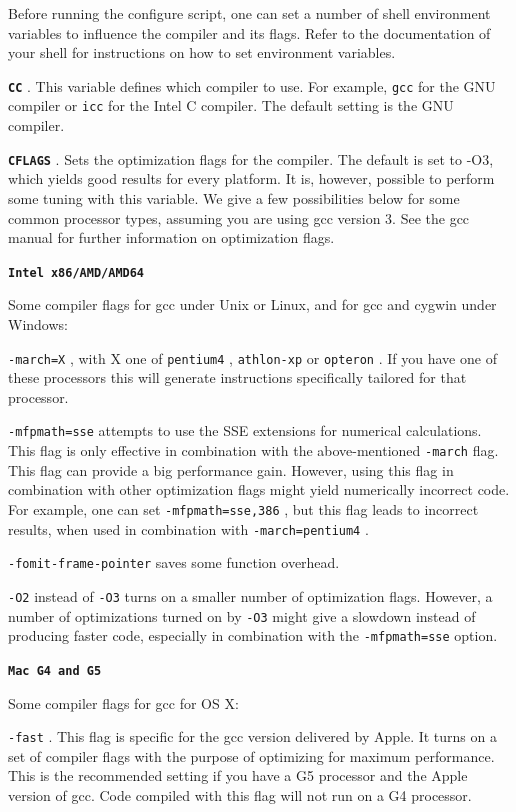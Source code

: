 \documentclass[12pt]{book}
\newcommand{\ttt}[1]{\texttt{#1} }
\newcommand{\tb}[1]{\texttt{\textbf{#1}} }
\begin{document}
Before running the configure script, one can set a number of shell environment variables to influence the 
compiler and its flags. Refer to the documentation of your shell for instructions on how to set environment
variables.

\tb{CC}. This variable defines which compiler to use. For example, \ttt{gcc} for the GNU compiler or 
\ttt{icc} for the Intel C compiler. The default setting is the GNU compiler.

\tb{CFLAGS}. Sets the optimization flags for the compiler. The default is set to -O3, which yields good 
results for every platform. It is, however, possible to perform some tuning with this variable. We give a 
few possibilities below for some common processor types, assuming you are using gcc version 3. See the gcc 
manual for further information on optimization flags.

\tb{{Intel x86/AMD/AMD64}} 

Some compiler flags for gcc under Unix or Linux, and for gcc and cygwin under Windows:

   \ttt{-march=X}, with X one of \ttt{pentium4}, \ttt{athlon-xp} or \ttt{opteron}. 
If you have one of these processors this will generate instructions specifically tailored for that processor.

   \ttt{-mfpmath=sse} attempts to use the SSE extensions for numerical calculations. This flag is only 
effective in combination with the above-mentioned \ttt{-march} flag. This flag can provide a big performance 
gain. However, using this flag in combination with other optimization flags might yield numerically 
incorrect code. For example, one can set \ttt{-mfpmath=sse,386}, but this flag leads to incorrect results, 
when used in combination with \ttt{-march=pentium4}. 
 
   \ttt{-fomit-frame-pointer} saves some function overhead. 

   \ttt{-O2} instead of \ttt{-O3} turns on a smaller number of optimization flags. However, a number of 
optimizations turned on by \ttt{-O3} might give a slowdown instead of producing faster code, especially in 
combination with the \ttt{-mfpmath=sse} option. 

\tb{{Mac G4 and G5}}

Some compiler flags for gcc for OS X:

  \ttt{-fast}. This flag is specific for the gcc version delivered by Apple. 
It turns on a set of compiler flags with the purpose of optimizing for maximum performance. This is the recommended 
setting if you have a G5 processor and the Apple version of gcc. Code compiled with this flag will not run on a 
G4 processor.
\end{document}
